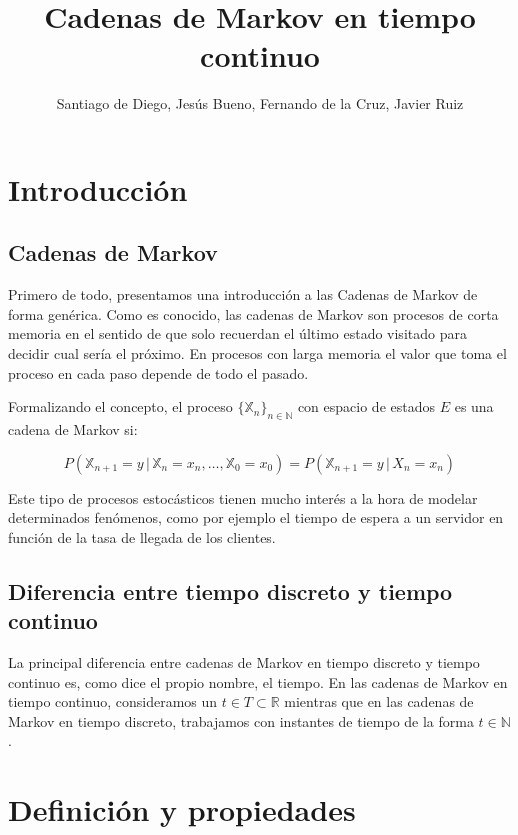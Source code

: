 \documentclass[12pt,a4paper]{article}
\author{Santiago de Diego, Jesús Bueno, Fernando de la Cruz, Javier Ruiz}
\title{Cadenas de Markov en tiempo continuo}
\date{}
\begin{document}
\maketitle
\newtheorem{theorem}{Teorema}[section]
\newtheorem{lemma}{Lema}[section]
\newtheorem{proof}{Demostración}[section]
\newpage
\tableofcontents
\newpage
\section{Introducción}
\subsection{Cadenas de Markov}
Primero de todo, presentamos una introducción a las Cadenas de Markov de forma genérica. Como es conocido, las cadenas de Markov son procesos de corta memoria en el sentido de que solo recuerdan el último estado visitado para decidir cual sería el próximo. En procesos con larga memoria el valor que toma el proceso en cada paso depende de todo el pasado.

Formalizando el concepto, el proceso $\{\mathbb{X}_n \}_{n\in \mathbb{N}}$ con espacio de estados $E$ es una cadena de Markov si:

$$P(\mathbb{X}_{n+1}=y \, | \, \mathbb{X}_n = x_n , \ldots , \mathbb{X}_0 = x_0)=P(\mathbb{X}_{n+1}=y \, | \, {X_n=x_n})$$

Este tipo de procesos estocásticos tienen mucho interés a la hora de modelar determinados fenómenos, como por ejemplo el tiempo de espera a un servidor en función de la tasa de llegada de los clientes.

\subsection{Diferencia entre tiempo discreto y tiempo continuo}
La principal diferencia entre cadenas de Markov en tiempo discreto y tiempo continuo es, como dice el propio nombre, el tiempo. En las cadenas de Markov en tiempo continuo, consideramos un $t\in T \subset \mathbb{R}$ mientras que en las cadenas de Markov en tiempo discreto, trabajamos con instantes de tiempo de la forma $t\in \mathbb{N}$.
\section{Definición y propiedades}
\end{document}
